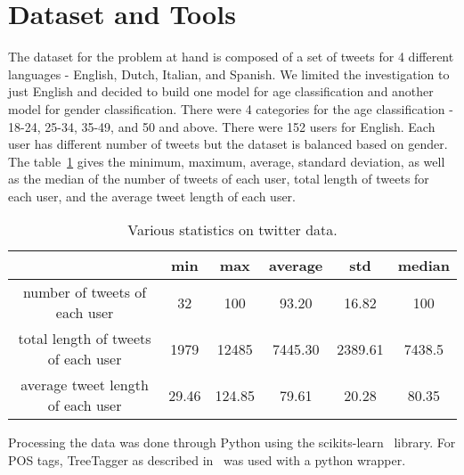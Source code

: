 \documentclass[a4paper]{llncs}
\begin{document}
\section{Dataset and Tools}
The dataset for the problem at hand is composed of a set of tweets for 4 different languages - English, Dutch, Italian, and Spanish. We limited the investigation to just English and decided to build one model for age classification and another model for gender classification. There were 4 categories for the age classification - 18-24, 25-34, 35-49, and 50 and above. There were 152 users for English. Each user has different number of tweets but the dataset is balanced based on gender. The table~\ref{table:TweetStats} gives the minimum, maximum, average, standard deviation, as well as the median of the number of tweets of each user, total length of tweets for each user, and the average tweet length of each user. 

\begin{table}[!htbp]
\centering
\begin{tabular}{|c|ccccc|}
\hline
                                    & min   & max    & average & std     & median \\ \hline
number of tweets of each user       & 32    & 100    & 93.20   & 16.82   & 100    \\ \hline
total length of tweets of each user & 1979  & 12485  & 7445.30 & 2389.61 & 7438.5 \\ \hline
average tweet length of each user   & 29.46 & 124.85 & 79.61   & 20.28   & 80.35  \\ \hline
\end{tabular}
\caption{Various statistics on twitter data.}
\label{table:TweetStats}
\end{table}

Processing the data was done through Python using the scikits-learn~\cite{scikit-learn} library. For POS tags, TreeTagger as described in~\cite{schmid1994probabilistic} was used with a python wrapper.
\end{document}
